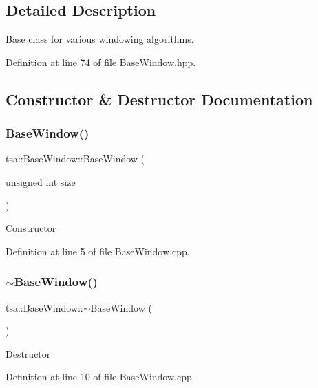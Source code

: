 \subsection{Detailed Description}
Base class for various windowing algorithms. 

Definition at line 74 of file Base\+Window.\+hpp.



\subsection{Constructor \& Destructor Documentation}
\mbox{\label{classtsa_1_1_base_window_aea4dee45722299896913859d7b899d6f}} 
\subsubsection{\texorpdfstring{Base\+Window()}{BaseWindow()}}
{\footnotesize\ttfamily tsa\+::\+Base\+Window\+::\+Base\+Window (\begin{DoxyParamCaption}\item[{unsigned int}]{size }\end{DoxyParamCaption})}

Constructor 

Definition at line 5 of file Base\+Window.\+cpp.

\mbox{\label{classtsa_1_1_base_window_a0e99ffa3d84e8c7a05f7de437bfd6241}} 
\subsubsection{\texorpdfstring{$\sim$\+Base\+Window()}{~BaseWindow()}}
{\footnotesize\ttfamily tsa\+::\+Base\+Window\+::$\sim$\+Base\+Window (\begin{DoxyParamCaption}{ }\end{DoxyParamCaption})\hspace{0.3cm}{\ttfamily [virtual]}}

Destructor 

Definition at line 10 of file Base\+Window.\+cpp.



